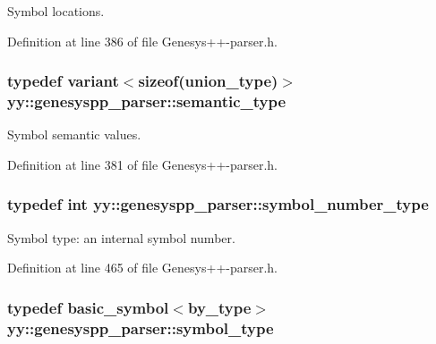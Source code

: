 Symbol locations. 



Definition at line 386 of file Genesys++-\/parser.\-h.

\hypertarget{classyy_1_1genesyspp__parser_a592978b9aaaa0d61f9faf4093f5f554d}{
\subsubsection[{semantic\-\_\-type}]{\setlength{\rightskip}{0pt plus 5cm}typedef {\bf variant}$<$sizeof({\bf union\-\_\-type})$>$ {\bf yy\-::genesyspp\-\_\-parser\-::semantic\-\_\-type}}}\label{classyy_1_1genesyspp__parser_a592978b9aaaa0d61f9faf4093f5f554d}


Symbol semantic values. 



Definition at line 381 of file Genesys++-\/parser.\-h.

\hypertarget{classyy_1_1genesyspp__parser_a0910f625bff73225656c83490dd5fe9f}{
\subsubsection[{symbol\-\_\-number\-\_\-type}]{\setlength{\rightskip}{0pt plus 5cm}typedef int {\bf yy\-::genesyspp\-\_\-parser\-::symbol\-\_\-number\-\_\-type}}}\label{classyy_1_1genesyspp__parser_a0910f625bff73225656c83490dd5fe9f}


Symbol type\-: an internal symbol number. 



Definition at line 465 of file Genesys++-\/parser.\-h.

\hypertarget{classyy_1_1genesyspp__parser_a5b9a172d481d4a62555ee11a7957e789}{
\subsubsection[{symbol\-\_\-type}]{\setlength{\rightskip}{0pt plus 5cm}typedef {\bf basic\-\_\-symbol}$<${\bf by\-\_\-type}$>$ {\bf yy\-::genesyspp\-\_\-parser\-::symbol\-\_\-type}}}\label{classyy_1_1genesyspp__parser_a5b9a172d481d4a62555ee11a7957e789}


